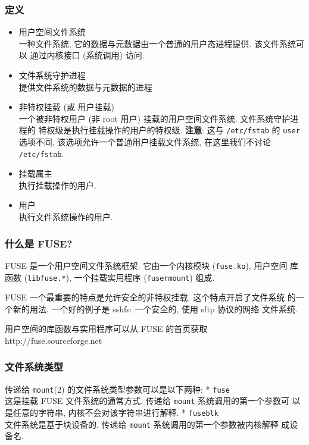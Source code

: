 \documentclass[nofonts]{ctexart}
\begin{document}
\subsubsection{定义}\label{ux5b9aux4e49}

\begin{itemize}
\item
  用户空间文件系统\\一种文件系统,
  它的数据与元数据由一个普通的用户态进程提供. 该文件系统可以
  通过内核接口 (系统调用) 访问.
\item
  文件系统守护进程\\提供文件系统的数据与元数据的进程
\item
  非特权挂载 (或 用户挂载)\\一个被非特权用户 (非 root 用户)
  挂载的用户空间文件系统. 文件系统守护进程的
  特权级是执行挂载操作的用户的特权级. \textbf{注意}: 这与
  \texttt{/etc/fstab} 的 \texttt{user} 选项不同,
  该选项允许一个普通用户挂载文件系统, 在这里我们不讨论
  \texttt{/etc/fstab}.
\item
  挂载属主\\执行挂载操作的用户.
\item
  用户\\执行文件系统操作的用户.
\end{itemize}

\subsubsection{什么是 FUSE?}\label{ux4ec0ux4e48ux662f-fuse}

FUSE 是一个用户空间文件系统框架. 它由一个内核模块 (\texttt{fuse.ko}),
用户空间 库函数 (\texttt{libfuse.*}), 一个挂载实用程序
(\texttt{fusermount}) 组成.

FUSE 一个最重要的特点是允许安全的非特权挂载. 这个特点开启了文件系统
的一个新的用法. 一个好的例子是 sshfs: 一个安全的, 使用 sftp 协议的网络
文件系统.

用户空间的库函数与实用程序可以从 FUSE 的首页获取
http://fuse.sourceforge.net

\subsubsection{文件系统类型}\label{ux6587ux4ef6ux7cfbux7edfux7c7bux578b}

传递给 \texttt{mount}(2) 的文件系统类型参数可以是以下两种: *
\texttt{fuse}\\这是挂载 FUSE 文件系统的通常方式. 传递给 \texttt{mount}
系统调用的第一个参数可 以是任意的字符串, 内核不会对该字符串进行解释. *
\texttt{fuseblk}\\文件系统是基于块设备的. 传递给 \texttt{mount}
系统调用的第一个参数被内核解释 成设备名.
\end{document}
